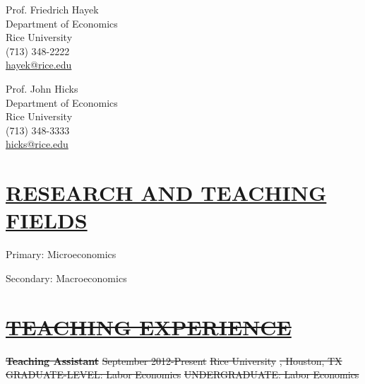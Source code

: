 \documentclass{res} %
\providecommand{\DIFdeltex}[1]{{\protect\color{red}\sout{#1}}}                      %
\providecommand{\DIFdelbegin}{} %
\providecommand{\DIFdel}[1]{\texorpdfstring{\DIFdeltex{#1}}{}} %
\begin{document}
\begin{resume}
\begin{minipage}[t]{0.5\textwidth}
Prof. Friedrich Hayek \\
Department of Economics \\
Rice University \\
(713) 348-2222\\
\href{mailto:  hayek@rice.edu}{hayek@rice.edu}\\
\end{minipage}%
\begin{minipage}[t]{0.5\textwidth}
Prof. John Hicks \\
Department of Economics\\
Rice University \\
(713) 348-3333 \\
\href{mailto:  hicks@rice.edu}{hicks@rice.edu}\\
\end{minipage}


\vspace{-.2cm}
\section{\scshape \underline{RESEARCH AND TEACHING FIELDS}}
\vspace{6pt} 
\noindent Primary: Microeconomics \par
\noindent Secondary: Macroeconomics

\vspace{-.2cm}
\DIFdelbegin \section{%
\underline{\DIFdel{TEACHING EXPERIENCE}}%
} 
\addtocounter{section}{-1}%

\textbf{\DIFdel{Teaching Assistant}} %
\DIFdel{September 2012-Present }%
\DIFdel{Rice University}%
\DIFdel{, Houston, TX }%
\DIFdel{GRADUATE-LEVEL: Labor Economics}%
\DIFdel{UNDERGRADUATE: Labor Economics}%


\end{resume}
\end{document}
